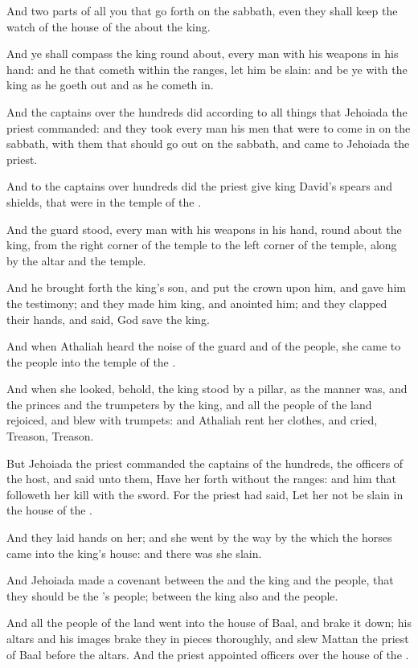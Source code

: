 \verse And two parts of all you that go forth on the sabbath, even they shall keep the watch of the house of the \LORD about the king.

\verse And ye shall compass the king round about, every man with his weapons in his hand: and he that cometh within the ranges, let him be slain: and be ye with the king as he goeth out and as he cometh in.

\verse And the captains over the hundreds did according to all things that Jehoiada the priest commanded: and they took every man his men that were to come in on the sabbath, with them that should go out on the sabbath, and came to Jehoiada the priest.

\verse And to the captains over hundreds did the priest give king David's spears and shields, that were in the temple of the \LORD.

\verse And the guard stood, every man with his weapons in his hand, round about the king, from the right corner of the temple to the left corner of the temple, along by the altar and the temple.

\verse And he brought forth the king's son, and put the crown upon him, and gave him the testimony; and they made him king, and anointed him; and they clapped their hands, and said, God save the king.

\verse And when Athaliah heard the noise of the guard and of the people, she came to the people into the temple of the \LORD.

\verse And when she looked, behold, the king stood by a pillar, as the manner was, and the princes and the trumpeters by the king, and all the people of the land rejoiced, and blew with trumpets: and Athaliah rent her clothes, and cried, Treason, Treason.

\verse But Jehoiada the priest commanded the captains of the hundreds, the officers of the host, and said unto them, Have her forth without the ranges: and him that followeth her kill with the sword. For the priest had said, Let her not be slain in the house of the \LORD.

\verse And they laid hands on her; and she went by the way by the which the horses came into the king's house: and there was she slain.

\verse And Jehoiada made a covenant between the \LORD and the king and the people, that they should be the \LORD's people; between the king also and the people.

\verse And all the people of the land went into the house of Baal, and brake it down; his altars and his images brake they in pieces thoroughly, and slew Mattan the priest of Baal before the altars. And the priest appointed officers over the house of the \LORD.

